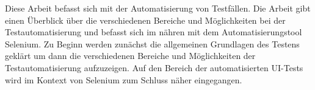 \label{sec:zusammenfassung}
Diese Arbeit befasst sich mit der Automatisierung von Testfällen. Die Arbeit gibt einen Überblick über die verschiedenen Bereiche und Möglichkeiten bei der Testautomatisierung und befasst sich im nähren mit dem Automatisierungstool Selenium.
Zu Beginn werden zunächst die allgemeinen Grundlagen des Testens geklärt um
dann die verschiedenen Bereiche und Möglichkeiten der Testautomatisierung aufzuzeigen. Auf den Bereich der automatisierten UI-Tests wird im Kontext von Selenium zum Schluss näher eingegangen.

